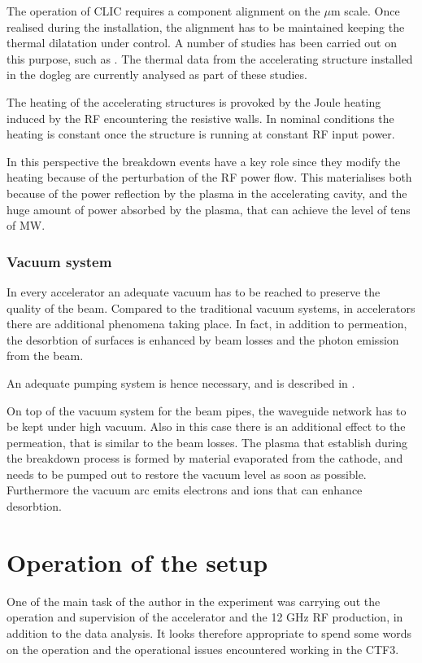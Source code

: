 The operation of CLIC requires a component alignment on the $\mu$m scale. Once realised during the installation, the alignment has to be maintained keeping the thermal dilatation under control. A number of studies has been carried out on this purpose, such as \cite{Daskalaki:2141828}. The thermal data from the accelerating structure installed in the dogleg are currently analysed as part of these studies.

The heating of the accelerating structures is provoked by the Joule heating induced by the RF encountering the resistive walls. In nominal conditions the heating is constant once the structure is running at constant RF input power. 

In this perspective the breakdown events have a key role since they modify the heating because of the perturbation of the RF power flow. This materialises both because of the power reflection by the plasma in the accelerating cavity, and the huge amount of power absorbed by the plasma, that can achieve the level of tens of MW.


\subsubsection{Vacuum system}

In every accelerator an adequate vacuum has to be reached to preserve the quality of the beam. Compared to the traditional vacuum systems, in accelerators there are additional phenomena taking place. In fact, in addition to permeation, the desorbtion of surfaces is enhanced by beam losses and the photon emission from the beam. 

An adequate pumping system is hence necessary, and is described in \cite{ctf3:dr}.

On top of the vacuum system for the beam pipes, the waveguide network has to be kept under high vacuum. Also in this case there is an additional effect to the permeation, that is similar to the beam losses. The plasma that establish during the breakdown process is formed by material evaporated from the cathode, and needs to be pumped out to restore the vacuum level as soon as possible. Furthermore the vacuum arc emits electrons and ions that can enhance desorbtion.


\section[Operation of the setup]{Operation of the setup}

One of the main task of the author in the experiment was carrying out the operation and supervision of the accelerator and the 12 GHz RF production, in addition to the data analysis. It looks therefore appropriate to spend some words on the operation and the operational issues encountered working in the CTF3.

